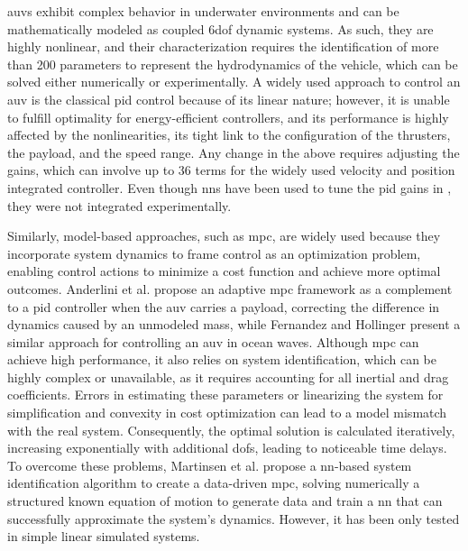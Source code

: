 \acp{auv} exhibit complex behavior in underwater environments and can be mathematically modeled as coupled \ac{6dof} dynamic systems. As such, they are highly nonlinear, and their characterization requires the identification of more than 200 parameters \cite{mcfarland2021} to represent the hydrodynamics of the vehicle, which can be solved either numerically or experimentally. A widely used approach to control an \ac{auv} is the classical \ac{pid} control because of its linear nature; however, it is unable to fulfill optimality for energy-efficient controllers, and its performance is highly affected by the nonlinearities, its tight link to the configuration of the thrusters, the payload, and the speed range. Any change in the above requires adjusting the gains, which can involve up to 36 terms for the widely used velocity and position integrated controller. Even though \acp{nn} have been used to tune the \ac{pid} gains in \cite{hernandez2016}, they were not integrated experimentally.

Similarly, model-based approaches, such as \ac{mpc}, are widely used because they incorporate system dynamics to frame control as an optimization problem, enabling control actions to minimize a cost function and achieve more optimal outcomes. Anderlini et al. \cite{anderlini2019} propose an adaptive \ac{mpc} framework as a complement to a \ac{pid} controller when the \ac{auv} carries a payload, correcting the difference in dynamics caused by an unmodeled mass, while Fernandez and Hollinger \cite{fernandez2016} present a similar approach for controlling an \ac{auv} in ocean waves. Although \ac{mpc} can achieve high performance, it also relies on system identification, which can be highly complex or unavailable, as it requires accounting for all inertial and drag coefficients. Errors in estimating these parameters or linearizing the system for simplification and convexity in cost optimization can lead to a model mismatch with the real system. Consequently, the optimal solution is calculated iteratively, increasing exponentially with additional \acp{dof}, leading to noticeable time delays. To overcome these problems, Martinsen et al. \cite{Martinsen2020} propose a \ac{nn}-based system identification algorithm to create a data-driven \ac{mpc}, solving numerically a structured known equation of motion to generate data and train a \ac{nn} that can successfully approximate the system's dynamics. However, it has been only tested in simple linear simulated systems.

